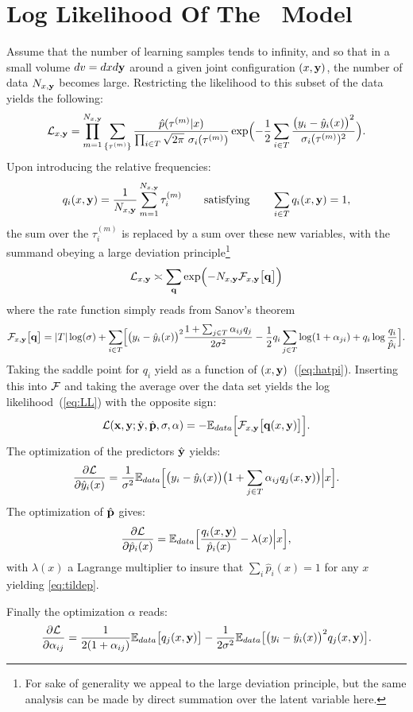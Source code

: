 \chapter{Log Likelihood Of The \XX \ Model}\label{app:LL}
Assume that the number of learning samples tends to infinity, and so that in a small volume $dv = dxd{\bf y}$ around a given  joint configuration $(x,{\bf y})$,
the number of data $N_{x,{\bf y}}$ becomes large. Restricting the likelihood to this subset of the data yields the following:
\[
{\cal L}_{x,{\bf y}} = \prod_{m=1}^{N_{x,{\bf y}}} \sum_{\{\tau^{(m)}\}} 
\frac{\hat p(\tau^{(m)}\vert x)}{\prod_{i\in T}\sqrt{2\pi}\ \sigma_i(\tau^{(m)})}
\exp\Bigl(-\frac{1}{2}\sum_{i\in T}\frac{\bigl(y_i-\hat y_i(x)\bigr)^2}{\sigma_i(\tau^{(m)})^2}\Bigr).
\]
Upon introducing the relative frequencies:
\[
q_i(x,{\bf y}) = \frac{1}{N_{x,{\bf y}}}\sum_{m=1}^{N_{x,{\bf y}}} \tau_i^{(m)} 
\qquad\text{satisfying}\qquad 
\sum_{i\in T} q_i(x,{\bf y}) = 1,
\]
the sum over the $\tau_i^{(m)}$ is replaced by a sum over these new variables, with the summand obeying a large deviation principle\footnote{For sake of generality we appeal to the large deviation principle, but the same analysis can be made by direct summation over the latent variable here.} 
\[
{\cal L}_{x,{\bf y}} \asymp \sum_{{\bf q}} 
\exp\Bigl(-N_{x,{\bf y}} {\cal F}_{x,{\bf y}}\bigl[{\bf q}\bigr]\Bigr)
\]
where the rate function simply reads from Sanov's theorem
\[
{\cal F}_{x,{\bf y}}\bigl[{\bf q}\bigr] = \vert T\vert\log(\sigma)+
\sum_{i\in T}\Bigl[\bigl(y_i-\hat y_i(x)\bigr)^2\frac{1+\sum_{j\in T}\alpha_{ij}q_j}{2\sigma^2}
-\frac{1}{2}q_i\sum_{j\in T}\log(1+\alpha_{ji})+q_i\log\frac{q_i}{\hat p_i}\Bigr].
\]
Taking the saddle point for $q_i$ yield as a function of $(x,{\bf y})$~(\cref{eq:hatpi}). 
Inserting this into ${\cal F}$ and taking the average over the data set yields the log likelihood~(\cref{eq:LL}) 
with the opposite sign:
\[
{\cal L}({\bf x},{\bf y};\hat {\bf y},\hat{\bf p},\sigma,\alpha) = -{\mathbb E}_{data}\Bigl[{\cal F}_{x,{\bf y}}\bigl[{\bf q}(x,{\bf y})\bigr]\Bigr].
\]
The optimization of the predictors $\hat {\bf y}$ yields:
\[
\frac{\partial{\cal L}}{\partial \hat y_i(x)} = \frac{1}{\sigma^2}{\mathbb E}_{data}\Bigl[ \bigl(y_i-\hat y_i(x)\bigr)\bigl(1+\sum_{j\in T}\alpha_{ij}q_j(x,{\bf y})\bigr)\Big\vert x\Bigr].
\]
The optimization of $\hat{\bf p}$ gives:
\[
\frac{\partial{\cal L}}{\partial \hat p_i(x)} = {\mathbb E}_{data}\Bigl[\frac{q_i(x,{\bf y})}{\hat p_i(x)}-\lambda(x)\Big\vert x \Bigr],
\]
with $\lambda(x)$ a Lagrange multiplier to insure that $\sum_i\hat p_i(x)=1$ 
for any $x$ yielding \cref{eq:tildep}.

Finally the optimization $\alpha$ reads:
\[
\frac{\partial{\cal L}}{\partial \alpha_{ij}} = \frac{1}{2(1+\alpha_{ij})}{\mathbb E}_{data}\bigl[q_j(x,{\bf y})\bigr]-\frac{1}{2\sigma^2}
{\mathbb E}_{data}\bigl[\bigl(y_i-\hat y_i(x)\bigr)^2q_j(x,{\bf y})\bigr].
\]
